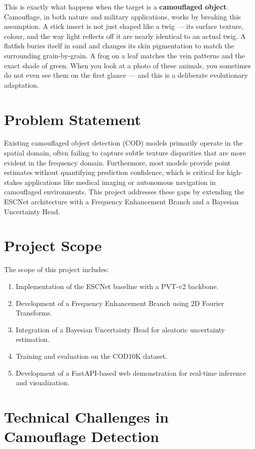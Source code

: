 \documentclass[12pt,a4paper]{report}
\begin{document}
This is exactly what happens when the target is a \textbf{camouflaged object}. Camouflage, in both nature and military applications, works by breaking this assumption. A stick insect is not just shaped like a twig — its surface texture, colour, and the way light reflects off it are nearly identical to an actual twig. A flatfish buries itself in sand and changes its skin pigmentation to match the surrounding grain-by-grain. A frog on a leaf matches the vein patterns and the exact shade of green. When you look at a photo of these animals, you sometimes do not even see them on the first glance — and this is a deliberate evolutionary adaptation.

\section{Problem Statement}

Existing camouflaged object detection (COD) models primarily operate in the spatial domain, often failing to capture subtle texture disparities that are more evident in the frequency domain. Furthermore, most models provide point estimates without quantifying prediction confidence, which is critical for high-stakes applications like medical imaging or autonomous navigation in camouflaged environments. This project addresses these gaps by extending the ESCNet architecture with a Frequency Enhancement Branch and a Bayesian Uncertainty Head.

\section{Project Scope}

The scope of this project includes:
\begin{enumerate}
    \item Implementation of the ESCNet baseline with a PVT-v2 backbone.
    \item Development of a Frequency Enhancement Branch using 2D Fourier Transforms.
    \item Integration of a Bayesian Uncertainty Head for aleatoric uncertainty estimation.
    \item Training and evaluation on the COD10K dataset.
    \item Development of a FastAPI-based web demonstration for real-time inference and visualization.
\end{enumerate}

\section{Technical Challenges in Camouflage Detection}
\end{document}

